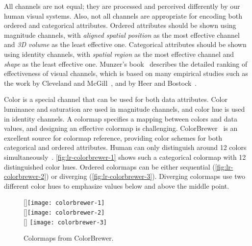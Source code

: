 All channels are not equal; they are processed and perceived differently by our human visual systems. Also, not all channels are appropriate for encoding both ordered and categorical attributes. Ordered attributes should be shown using magnitude channels, with \emph{aligned spatial position} as the most effective channel and \emph{3D volume} as the least effective one. Categorical attributes should be shown using identity channels, with \emph{spatial region} as the most effective channel and \emph{shape} as the least effective one. Munzer's book~\cite{Munzner2014} describes the detailed ranking of effectiveness of visual channels, which is based on many empirical studies such as the work by Cleveland and McGill~\cite{Cleveland1985}, and by Heer and Bostock~\cite{Heer2010a}.
%

Color is a special channel that can be used for both data attributes. Color luminance and saturation are used in magnitude channels, and color hue is used in identity channels. A colormap specifies a mapping between colors and data values, and designing an effective colormap is challenging. ColorBrewer~\cite{Harrower2003} is an excellent source for colormap reference, providing color schemes for both categorical and ordered attributes. Human can only distinguish around 12 colors simultaneously~\cite{Munzner2014}. \autoref{fig:lr-colorbrewer-1} shows such a categorical colormap with 12 distinguished color hues. Ordered colormaps can be either sequential (\autoref{fig:lr-colorbrewer-2}) or diverging (\autoref{fig:lr-colorbrewer-3}). Diverging colormaps use two different color hues to emphasize values below and above the middle point.

\begin{figure}[!htb]
	\centering
	[\columnwidth]{\texttt{[image: colorbrewer-1]}} 
	\\
	[\columnwidth]{\hspace{-.15\columnwidth}\texttt{[image: colorbrewer-2]}}
	\\
	[\columnwidth]{\hspace{-.05\columnwidth} \texttt{[image: colorbrewer-3]}}
	\caption{Colormaps from ColorBrewer. }
\end{figure}

